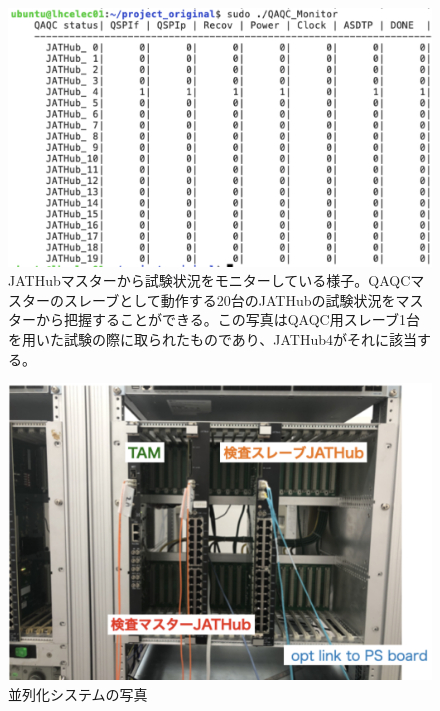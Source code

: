 \begin{figure} 
\centering
\includegraphics[width=16cm]{fig/QAQC/QAQC_monitor.png}
\caption[JATHubマスターからの試験状況のモニター]{JATHubマスターから試験状況をモニターしている様子。QAQCマスターのスレーブとして動作する20台のJATHubの試験状況をマスターから把握することができる。この写真はQAQC用スレーブ1台を用いた試験の際に取られたものであり、JATHub4がそれに該当する。}
\label{QAQC_monitor}
\end{figure}

\begin{figure} 
\centering
\includegraphics[width=16cm]{fig/QAQC/QAQCpararellpicture.png}
\caption[並列化システムの写真]{並列化システムの写真}
\label{QAQCpararellpicture}
\end{figure}

